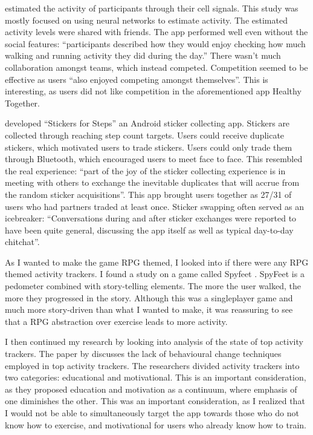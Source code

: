 \documentclass{l4proj}
\begin{document}
\citet{Shakra} estimated the activity of participants through their cell signals. This study was mostly focused on using neural networks to estimate activity. The estimated activity levels were shared with friends. The app performed well even without the social features: ``participants described how they would enjoy checking how much walking and running activity they did during the day.'' There wasn't much collaboration amongst teams, which instead competed. Competition seemed to be effective as users ``also enjoyed competing amongst themselves''. This is interesting, as users did not like competition in the aforementioned app Healthy Together. 

\citet{Stickers} developed ``Stickers for Steps'' an Android sticker collecting app. Stickers are collected through reaching step count targets. Users could receive duplicate stickers, which motivated users to trade stickers. Users could only trade them through Bluetooth, which encouraged users to meet face to face. This resembled the real experience: ``part of the joy of the sticker collecting experience is in meeting with others to exchange the inevitable duplicates that will accrue from the random sticker acquisitions''. This app brought users together as 27/31 of users who had partners traded at least once. Sticker swapping often served as an icebreaker: ``Conversations during and after sticker exchanges were reported to have been quite general, discussing the app itself as well as typical day-to-day chitchat''.

As I wanted to make the game RPG themed, I looked into if there were any RPG themed activity trackers. I found a study on a game called Spyfeet \citep{SpyFeet}. SpyFeet is a pedometer combined with story-telling elements. The more the user walked, the more they progressed in the story. Although this was a singleplayer game and much more story-driven than what I wanted to make, it was reassuring to see that a RPG abstraction over exercise leads to more activity.

I then continued my research by looking into analysis of the state of top activity trackers. The paper by \citet{Behavior_change} discusses the lack of behavioural change techniques employed in top activity trackers. The researchers divided activity trackers into two categories: educational and motivational. This is an important consideration, as they proposed education and motivation as a continuum, where emphasis of one diminishes the other. This was an important consideration, as I realized that I would not be able to simultaneously target the app towards those who do not know how to exercise, and motivational for users who already know how to train.
\end{document}

